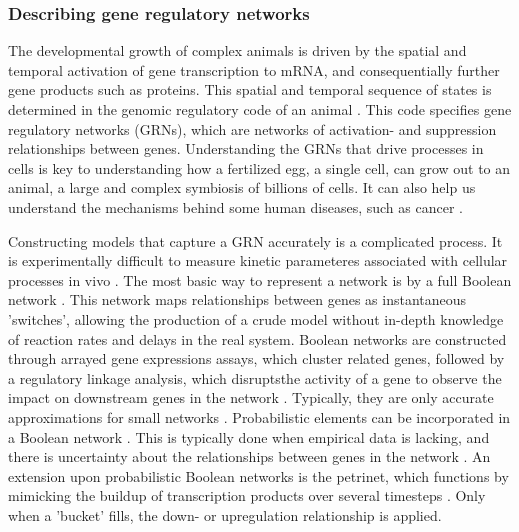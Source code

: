 \documentclass[../main.tex]{subfiles}
\begin{document}
\subsubsection{Describing gene regulatory networks}

The developmental growth of complex animals is driven by the spatial and temporal activation of gene transcription to mRNA, and consequentially further gene products such as proteins.
This spatial and temporal sequence of states is determined in the genomic regulatory code of an animal \cite{bolouri2002modeling, kuhn2009monte}.
This code specifies gene regulatory networks (GRNs), which are networks of activation- and suppression relationships between genes.
Understanding the GRNs that drive processes in cells is key to understanding how a fertilized egg, a single cell, can grow out to an animal, a large and complex symbiosis of billions of cells.
It can also help us understand the mechanisms behind some human diseases, such as cancer \cite{qian2008inference}.

Constructing models that capture a GRN accurately is a complicated process.
It is experimentally difficult to measure kinetic parameteres associated with cellular processes in vivo \cite{bolouri2002modeling}.
The most basic way to represent a network is by a full Boolean network \cite{bolouri2002modeling}.
This network maps relationships between genes as instantaneous 'switches', allowing the production of a crude model without in-depth knowledge of reaction rates and delays in the real system.
Boolean networks are constructed through arrayed gene expressions assays, which cluster related genes, followed by a regulatory linkage analysis, which disruptsthe activity of a gene to observe the impact on downstream genes in the network \cite{bolouri2002modeling, wu2013high}.
Typically, they are only accurate approximations for small networks \cite{karlebach2008modelling}.
Probabilistic elements can be incorporated in a Boolean network \cite{schlitt2007current}.
This is typically done when empirical data is lacking, and there is uncertainty about the relationships between genes in the network \cite{karlebach2008modelling}.
An extension upon probabilistic Boolean networks is the petrinet, which functions by mimicking the buildup of transcription products over several timesteps \cite{karlebach2008modelling}.
Only when a 'bucket' fills, the down- or upregulation relationship is applied.
\end{document}
